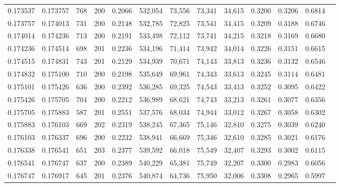 \begin{tabular}{rrrrrrrrrrrrr}
0.173537 & 0.173757 &   768 & 200 &                                     0.2066 & 532,054 &  73,556 &  73,341 &  34,615 & 0.3200 & 0.3206 & 0.6814 \\
0.173757 & 0.174013 &   731 & 200 &                                     0.2148 & 532,785 &  72,825 &  73,541 &  34,415 & 0.3209 & 0.3188 & 0.6746 \\
0.174014 & 0.174236 &   713 & 200 &                                     0.2191 & 533,498 &  72,112 &  73,741 &  34,215 & 0.3218 & 0.3169 & 0.6680 \\
0.174236 & 0.174514 &   698 & 201 &                                     0.2236 & 534,196 &  71,414 &  73,942 &  34,014 & 0.3226 & 0.3151 & 0.6615 \\
0.174515 & 0.174831 &   743 & 201 &                                     0.2129 & 534,939 &  70,671 &  74,143 &  33,813 & 0.3236 & 0.3132 & 0.6546 \\
0.174832 & 0.175100 &   710 & 200 &                                     0.2198 & 535,649 &  69,961 &  74,343 &  33,613 & 0.3245 & 0.3114 & 0.6481 \\
0.175101 & 0.175426 &   636 & 200 &                                     0.2392 & 536,285 &  69,325 &  74,543 &  33,413 & 0.3252 & 0.3095 & 0.6422 \\
0.175426 & 0.175705 &   704 & 200 &                                     0.2212 & 536,989 &  68,621 &  74,743 &  33,213 & 0.3261 & 0.3077 & 0.6356 \\
0.175705 & 0.175883 &   587 & 201 &                                     0.2551 & 537,576 &  68,034 &  74,944 &  33,012 & 0.3267 & 0.3058 & 0.6302 \\
0.175883 & 0.176103 &   669 & 202 &                                     0.2319 & 538,245 &  67,365 &  75,146 &  32,810 & 0.3275 & 0.3039 & 0.6240 \\
0.176103 & 0.176337 &   696 & 200 &                                     0.2232 & 538,941 &  66,669 &  75,346 &  32,610 & 0.3285 & 0.3021 & 0.6176 \\
0.176338 & 0.176541 &   651 & 203 &                                     0.2377 & 539,592 &  66,018 &  75,549 &  32,407 & 0.3293 & 0.3002 & 0.6115 \\
0.176541 & 0.176747 &   637 & 200 &                                     0.2389 & 540,229 &  65,381 &  75,749 &  32,207 & 0.3300 & 0.2983 & 0.6056 \\
0.176747 & 0.176917 &   645 & 201 &                                     0.2376 & 540,874 &  64,736 &  75,950 &  32,006 & 0.3308 & 0.2965 & 0.5997 \\

\end{tabular}
